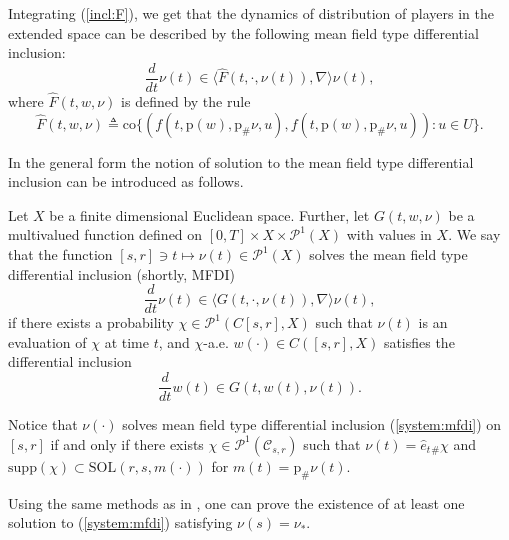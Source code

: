 \documentclass[a4paper,12pt]{article}
\begin{document}
Integrating (\ref{incl:F}), we get that the dynamics  of distribution of players in the extended space can be described by the following mean field type differential inclusion:
\begin{equation}\label{system:mfdi}
\frac{d}{dt}\nu(t)\in \langle \widehat{F}(t,\cdot,\nu(t)),\nabla\rangle \nu(t), 
\end{equation} where $\widehat{F}(t,w,\nu)$ is defined by the rule
\begin{equation}\label{intro:hat_F}
\widehat{F}(t,w,\nu)\triangleq \mathrm{co}\{(f(t,\mathrm{p}(w),\mathrm{p}_\#\nu,u),f(t,\mathrm{p}(w),\mathrm{p}_\#\nu,u)):u\in U\}. 
\end{equation}

In the general form the notion of solution to the mean field type differential inclusion can be introduced as follows.
\begin{definition}\label{def:solution_mfdi} Let $X$ be a finite dimensional Euclidean space. Further, 
	let $G(t,w,\nu)$ be a multivalued function defined on $[0,T]\times X\times\mathcal{P}^1(X)$ with values in $X$. We say that the function $[s,r]\ni t\mapsto \nu(t)\in\mathcal{P}^1(X)$ solves the mean field type differential inclusion (shortly, MFDI)
	$$\frac{d}{dt}\nu(t)\in \langle G(t,\cdot,\nu(t)),\nabla\rangle \nu(t), $$ if there exists a probability $\chi\in \mathcal{P}^1(C[s,r],X)$ such that $\nu(t)$ is an evaluation of $\chi$ at time $t$, and  $\chi$-a.e. $w(\cdot)\in C([s,r],X)$ satisfies the differential inclusion
	$$\frac{d}{dt}w(t)\in G(t,w(t),\nu(t)). $$
\end{definition}



\begin{remark}\label{remark:mfdi}
	Notice that  $\nu(\cdot)$ solves mean field type differential inclusion (\ref{system:mfdi}) on $[s,r]$ if and only if there exists $\chi\in \mathcal{P}^1(\mathcal{C}_{s,r})$ such that $\nu(t)=\hat{e}_t{}_\#\chi$ and $\mathrm{supp}(\chi)\subset \mathrm{SOL}(r,s,m(\cdot))$ for $m(t)=\mathrm{p}_\#\nu(t)$.
\end{remark}
Using the same methods as in \cite{Sznitman}, one can prove the existence of at least one solution to (\ref{system:mfdi}) satisfying $\nu(s)=\nu_*$.
\end{document}
